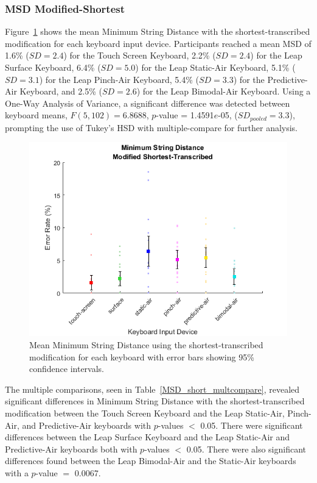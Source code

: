 \subsubsection{MSD Modified-Shortest}
Figure~\ref{fig_MSD_short_mean} shows the mean Minimum String Distance with the shortest-transcribed modification for each keyboard input device. Participants reached a mean MSD of 1.6\% ($SD = 2.4$) for the Touch Screen Keyboard, 2.2\% ($SD = 2.4$) for the Leap Surface Keyboard, 6.4\% ($SD = 5.0$) for the Leap Static-Air Keyboard, 5.1\% ($SD = 3.1$) for the Leap Pinch-Air Keyboard, 5.4\% ($SD = 3.3$) for the Predictive-Air Keyboard, and 2.5\% ($SD = 2.6$) for the Leap Bimodal-Air Keyboard. Using a One-Way Analysis of Variance, a significant difference was detected between keyboard means, $F(5, 102) = 6.8688$, $p$-value = 1.4591$e$-05, ($SD_{pooled} = 3.3$), prompting the use of Tukey's HSD with multiple-compare for further analysis.

\begin{figure}[h]
	\centering
	\includegraphics{fig_MSD_short_mean}
	\caption[Mean Minimum String Distance for Modified-Shortest]{Mean Minimum String Distance using the shortest-transcribed modification for each keyboard with error bars showing 95\% confidence intervals.}
	\label{fig_MSD_short_mean}
\end{figure}

The multiple comparisons, seen in Table~\ref{MSD_short_multcompare}, revealed significant differences in Minimum String Distance with the shortest-transcribed modification between the Touch Screen Keyboard and the Leap Static-Air, Pinch-Air, and Predictive-Air keyboards with $p$-values $<$ 0.05. There were significant differences between the Leap Surface Keyboard and the Leap Static-Air and Predictive-Air keyboards both with $p$-values $<$ 0.05. There were also significant differences found between the Leap Bimodal-Air and the Static-Air keyboards with a $p$-value $=$ 0.0067.

